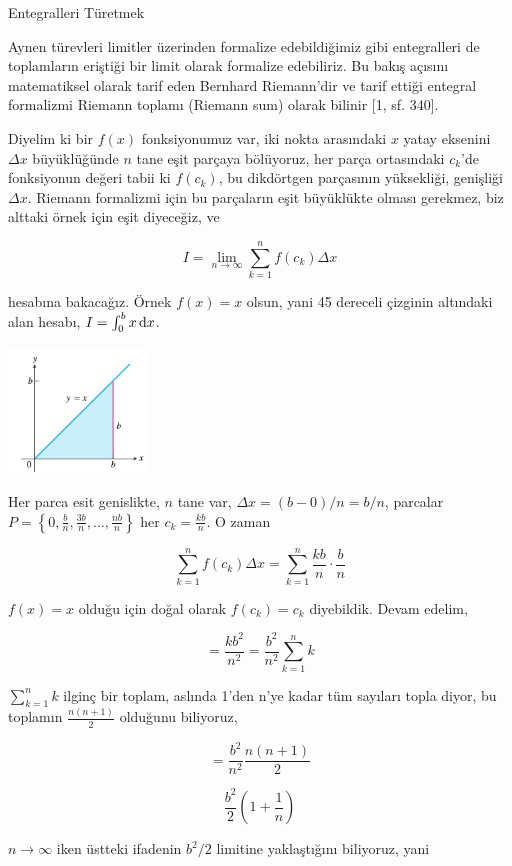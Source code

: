 \documentclass[12pt,fleqn]{article}\usepackage{../../common}
\begin{document}
Entegralleri Türetmek

Aynen türevleri limitler üzerinden formalize edebildiğimiz gibi
entegralleri de toplamların eriştiği bir limit olarak formalize
edebiliriz. Bu bakış açısını matematiksel olarak tarif eden Bernhard
Riemann'dir ve tarif ettiği entegral formalizmi Riemann toplamı (Riemann
sum) olarak bilinir [1, sf. 340]. 

Diyelim ki bir $f(x)$ fonksiyonumuz var, iki nokta arasındaki $x$ yatay
eksenini $\Delta x$ büyüklüğünde $n$ tane eşit parçaya bölüyoruz, her parça
ortasındaki $c_k$'de fonksiyonun değeri tabii ki $f(c_k)$, bu dikdörtgen
parçasının yüksekliği, genişliği $\Delta x$. Riemann formalizmi için bu
parçaların eşit büyüklükte olması gerekmez, biz alttaki örnek için eşit
diyeceğiz, ve

$$ 
I = \lim_{n \to \infty} \sum _{k=1}^{n} f(c_k) \Delta x
$$

hesabına bakacağız. Örnek $f(x) = x$ olsun, yani 45 dereceli çizginin
altındaki alan hesabı, $I = \int _{0}^{b} x \,\mathrm{d} x$.

\includegraphics[width=10em]{ode_mattuck_94_int_01.png}

Her parca esit genislikte, $n$ tane var, $\Delta x = (b - 0) / n = b/n$,
parcalar $P = \left\{ 0, \frac{b}{n}, \frac{3b}{n}, ..., \frac{nb}{n}
\right\}$ her $c_k = \frac{kb}{n}$. O zaman 

$$ 
\sum _{k=1}^{n} f(c_k) \Delta x = \sum _{k=1}^{n} \frac{kb}{n} \cdot \frac{b}{n}
$$

$f(x) = x$ olduğu için doğal olarak $f(c_k)=c_k$ diyebildik. Devam edelim, 

$$ 
= \frac{kb^2}{n^2} = \frac{b^2}{n^2} \sum _{k=1}^{n} k
$$

$\sum _{k=1}^{n} k$ ilginç bir toplam, aslında 1'den n'ye kadar tüm
sayıları topla diyor, bu toplamın $\frac{n(n+1)}{2}$ olduğunu biliyoruz, 

$$ 
= \frac{b^2}{n^2} \frac{n(n+1)}{2}
$$

$$ 
\frac{b^2}{2} (1 + \frac{1}{n})
$$

$n \to \infty$ iken üstteki ifadenin $b^2/2$ limitine yaklaştığını
biliyoruz, yani
\end{document}

